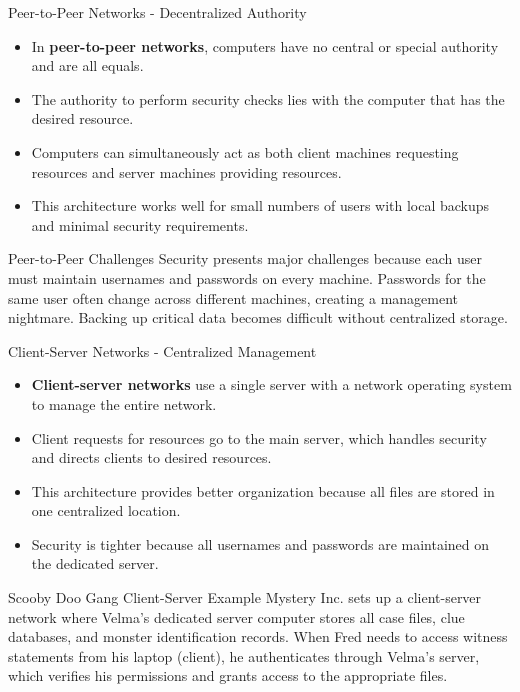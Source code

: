 \documentclass[aspectratio=169]{beamer}
\begin{document}
	\begin{frame}{Peer-to-Peer Networks - Decentralized Authority}
		\begin{itemize}
			\item In \textbf{peer-to-peer networks}, computers have no central or special authority and are all equals.
			\item The authority to perform security checks lies with the computer that has the desired resource.
			\item Computers can simultaneously act as both client machines requesting resources and server machines providing resources.
			\item This architecture works well for small numbers of users with local backups and minimal security requirements.
		\end{itemize}
		
		\begin{alertblock}{Peer-to-Peer Challenges}
			Security presents major challenges because each user must maintain usernames and passwords on every machine. Passwords for the same user often change across different machines, creating a management nightmare. Backing up critical data becomes difficult without centralized storage.
		\end{alertblock}
	\end{frame}
	
	\begin{frame}{Client-Server Networks - Centralized Management}
		\begin{itemize}
			\item \textbf{Client-server networks} use a single server with a network operating system to manage the entire network.
			\item Client requests for resources go to the main server, which handles security and directs clients to desired resources.
			\item This architecture provides better organization because all files are stored in one centralized location.
			\item Security is tighter because all usernames and passwords are maintained on the dedicated server.
		\end{itemize}
		
		\begin{exampleblock}{Scooby Doo Gang Client-Server Example}
			Mystery Inc. sets up a client-server network where Velma's dedicated server computer stores all case files, clue databases, and monster identification records. When Fred needs to access witness statements from his laptop (client), he authenticates through Velma's server, which verifies his permissions and grants access to the appropriate files.
		\end{exampleblock}
	\end{frame}
	
\end{document}
